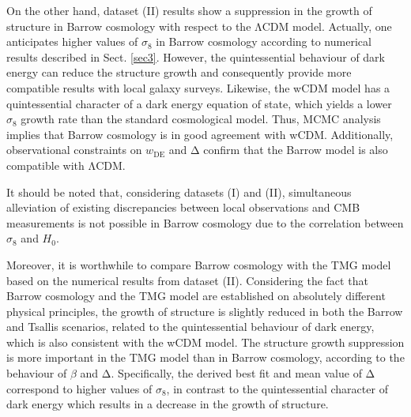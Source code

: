 \documentclass[11pt,twocolumn]{article}
\begin{document}
On the other hand, dataset (II)
results show a suppression in the growth of structure in Barrow
cosmology with respect to the $\mathrm{\Lambda}$CDM model. Actually, one
anticipates higher values of $\sigma_8$ in Barrow cosmology
according to numerical results described in Sect. \ref{sec3}.
However, the quintessential behaviour of dark energy can reduce
the structure growth and consequently provide more compatible
results with local galaxy surveys. Likewise, the wCDM model 
has a quintessential character of a dark energy equation of state, 
which yields a lower $\sigma_8$ growth rate than the standard 
cosmological model. Thus, MCMC analysis implies that 
Barrow cosmology is in good agreement with wCDM. Additionally, 
observational constraints on $w_{\mathrm{DE}}$ and $\mathrm{\Delta}$ 
confirm that the Barrow model is also compatible with $\mathrm{\Lambda}$CDM.

It should be noted that,
considering datasets (I) and (II), simultaneous alleviation of
existing discrepancies between local observations and CMB
measurements is not possible in Barrow cosmology due to the
correlation between $\sigma_8$ and $H_0$.

Moreover, it is worthwhile to compare Barrow cosmology with the TMG model
based on the numerical results from dataset (II). Considering the fact that
Barrow cosmology and the TMG model are established on absolutely different
physical principles, the growth of structure is slightly reduced in
both the Barrow and Tsallis scenarios, related to the quintessential behaviour
of dark energy, which is also consistent with the wCDM model.
The structure growth suppression is more important
in the TMG model than in Barrow cosmology, according to the behaviour
of $\beta$ and $\mathrm{\Delta}$. Specifically, the derived best fit
and mean value of $\mathrm{\Delta}$ correspond to higher values of
$\sigma_8$, in contrast to the quintessential character of
dark energy which results in a decrease in the growth of structure.
\end{document}

